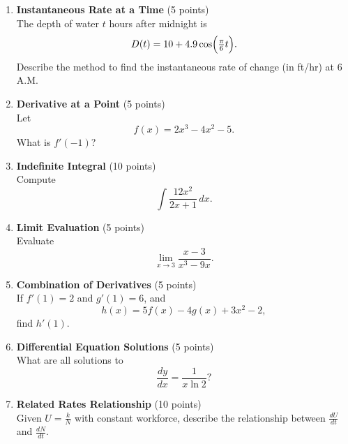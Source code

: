 \begin{enumerate}
  \item \textbf{Instantaneous Rate at a Time} (5 points)\\
  The depth of water $t$ hours after midnight is
  \[
    D(t) = 10 + 4.9 \cos\Bigl(\tfrac{\pi}{6} t\Bigr).
  \]
  Describe the method to find the instantaneous rate of change (in ft/hr) at 6 A.M.
  \begin{subanswer}
  \end{subanswer}

  \item \textbf{Derivative at a Point} (5 points)\\
  Let
  \[
    f(x) = 2x^3 - 4x^2 - 5.
  \]
  What is $f'(-1)$?
  \begin{subanswer}
  \end{subanswer}

  \item \textbf{Indefinite Integral} (10 points)\\
  Compute
  \[
    \int \frac{12 x^2}{2x + 1} \,dx.
  \]
  \begin{subanswer}
  \end{subanswer}

  \item \textbf{Limit Evaluation} (5 points)\\
  Evaluate
  \[
    \lim_{x \to 3} \frac{x - 3}{x^3 - 9x}.
  \]
  \begin{subanswer}
  \end{subanswer}

  \item \textbf{Combination of Derivatives} (5 points)\\
  If $f'(1) = 2$ and $g'(1) = 6$, and
  \[
    h(x) = 5f(x) - 4g(x) + 3x^2 - 2,
  \]
  find $h'(1)$.
  \begin{subanswer}
  \end{subanswer}

  \item \textbf{Differential Equation Solutions} (5 points)\\
  What are all solutions to
  \[
    \frac{dy}{dx} = \frac{1}{x \ln 2}?
  \]
  \begin{subanswer}
  \end{subanswer}

  \item \textbf{Related Rates Relationship} (10 points)\\
  Given $U = \tfrac{k}{N}$ with constant workforce, describe the relationship between $\tfrac{dU}{dt}$ and $\tfrac{dN}{dt}$.
  \begin{subanswer}
  \end{subanswer}


\end{enumerate}
